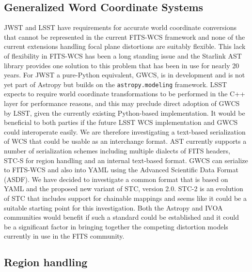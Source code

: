 \documentclass[]{spie}  %
\begin{document}
\subsection{Generalized Word Coordinate Systems}

JWST and LSST have requirements for accurate world coordinate conversions that cannot be represented in the current FITS-WCS framework\cite{2013ASPC..475...49H,2002A&A...395.1077C,2015A&C....12..133T} and none of the current extensions handling focal plane distortions are suitably flexible\cite{2012SPIE.8451E..1MS,2012tpv}.
This lack of flexibility in FITS-WCS has been a long standing issue and the Starlink AST library\cite{Berry201633} provides one solution to this problem that has been in use for nearly 20 years.
For JWST a pure-Python equivalent, GWCS, is in development\cite{2016_P028_adassxxv} and is not yet part of Astropy but builds on the \texttt{astropy.modeling} framework.
LSST expects to require world coordinate transformations to be performed in the C++ layer for performance reasons, and this may preclude direct adoption of GWCS by LSST, given the currently existing Python-based implementation.
It would be beneficial to both parties if the future LSST WCS implementation and GWCS could interoperate easily.
We are therefore investigating a text-based serialization of WCS that could be usable as an interchange format.
AST currently supports a number of serialization schemes including multiple dialects of FITS headers, STC-S\cite{2007ivoa.spec.1030R} for region handling\cite{2010ASPC..434..213B} and an internal text-based format.
GWCS can serialize to FITS-WCS and also into YAML using the Advanced Scientific Data Format (ASDF)\cite{2015A&C....12..240G}.
We have decided to investigate a common format that is based on YAML and the proposed new variant of STC, version 2.0.
STC-2\cite{2015ivoaSTC2} is an evolution of STC that includes support for chainable mappings and seems like it could be a suitable starting point for this investigation.
Both the Astropy and IVOA communities would benefit if such a standard could be established and it could be a significant factor in bringing together the competing distortion models currently in use in the FITS community.

\subsection{Region handling}
\end{document}
